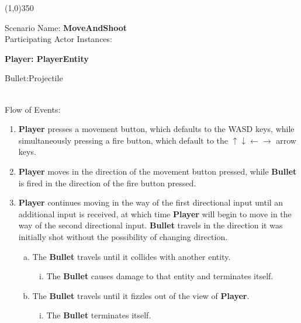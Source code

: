 \documentclass[12pt]{article}       %
\begin{document}
\begin{center} \line(1,0){350} \end{center}
Scenario Name: {\bf MoveAndShoot} \\
Participating Actor Instances:        \hspace{46pt} {\bf Player: PlayerEntity

					          \hspace{2.6 in}   Bullet:Projectile}  \vspace{10pt}  \\ 
Flow of Events: 
\begin{enumerate} 
\item {\bf Player} presses a movement button, which defaults to the WASD keys, while simultaneously pressing a fire button, which default to the $ \uparrow \downarrow \leftarrow \to $ arrow keys.
\item {\bf Player} moves in the direction of the movement button pressed, while {\bf Bullet} is fired in the direction of the fire button pressed.
\item {\bf Player} continues moving in the way of the first directional input until an additional input is received, at which time {\bf Player} will begin to move in the way of the second directional input. {\bf Bullet} travels in the direction it was initially shot without the possibility of changing direction.
      \begin{enumerate}[a.]
      \item The {\bf Bullet} travels until it collides with another entity.
                \begin{enumerate}[i.]
                \item The {\bf Bullet} causes damage to that entity and terminates itself.
                \end{enumerate}
      \item The {\bf Bullet} travels until it fizzles out of the view of {\bf Player}.
                \begin{enumerate}[i.]
                \item The {\bf Bullet} terminates itself.
                \end{enumerate}
        \end{enumerate}
\end{enumerate}
\end{document}
